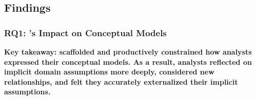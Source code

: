 \begin{comment}

\subsubsection{\evalStatisticalModels}
We used AIC, BIC, and R-squared values to assess how well statistical models
authored with vs. without rTisane fit the data. We used rTisane to statistically
model and assess the influence of rTisane on AIC, BIC, and R-squared values.

We also thematically analyzed participants' reactions to the similarities,
differences, and surprises between statistical models. 

\end{comment}

\subsection{Findings}
\subsubsection{RQ1: \rTisane's Impact on Conceptual Models}
\conceptualModelsScaffold

\textbf{Key takeaway: \rTisane scaffolded and productively constrained how analysts expressed
their conceptual models. As a result, analysts reflected on implicit domain
assumptions more deeply, considered new relationships, and felt they
accurately externalized their implicit assumptions.}

